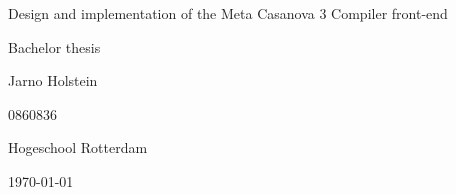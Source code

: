 \documentclass[12pt,a4paper]{report}
\begin{document}
\begin{titlepage}
	\centering
	\vspace{1cm}
	       {\huge Design and implementation of the Meta Casanova 3 Compiler front-end\par}
	
	\vspace{1cm}
	       {\huge Bachelor thesis\par}
	\vspace{2cm}
	{\Large Jarno Holstein\par}
	
	0860836\par
	\vspace{2cm}
	Hogeschool Rotterdam

	\par \vspace{2cm}

	{\large \today\par}
\end{titlepage}
\end{document}
